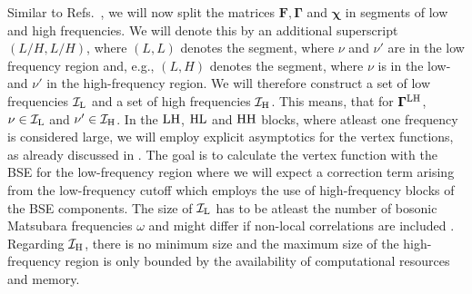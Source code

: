 \documentclass[\main/main.tex]{subfiles}
\begin{document}
Similar to Refs.~\cite{Kunes2011, Hummel2014, Tagliavini2018}, we will now split the matrices $\bm{F}, \bm{\Gamma}$ and $\bm{\chi}$ in segments of low and high frequencies. We will denote this by an additional superscript $(L/H, L/H)$, where $(L,L)$ denotes the segment, where $\nu$ and $\nu'$ are in the low frequency region and, e.g., $(L,H)$ denotes the segment, where $\nu$ is in the low- and $\nu'$ in the high-frequency region. We will therefore construct a set of low frequencies $\mathcal{I}_{\text{L}}$ and a set of high frequencies $\mathcal{I}_{\text{H}}$. This means, that for $\bm\Gamma^{\text{L}\text{H}}$, $\nu\in\mathcal{I}_{\text{L}}$ and $\nu'\in\mathcal{I}_{\text{H}}$. In the $\text{L}\text{H}$, $\text{H}\text{L}$ and $\text{H}\text{H}$ blocks, where atleast one frequency is considered large, we will employ explicit asymptotics for the vertex functions, as already discussed in . The goal is to calculate the vertex function with the BSE for the low-frequency region where we will expect a correction term arising from the low-frequency cutoff which employs the use of high-frequency blocks of the BSE components. The size of $\mathcal{I}_{\text{L}}$ has to be atleast the number of bosonic Matsubara frequencies $\omega$ \cite{Tagliavini2018} and might differ if non-local correlations are included \cite{Kinza2013}. Regarding $\mathcal{I}_{\text{H}}$, there is no minimum size and the maximum size of the high-frequency region is only bounded by the availability of computational resources and memory. 
\end{document}
